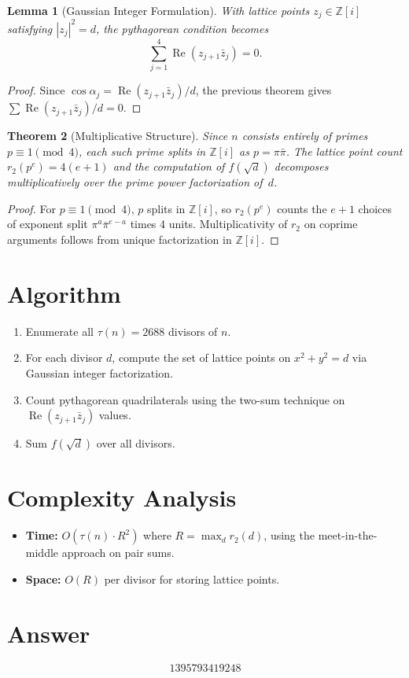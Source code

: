 \documentclass[11pt]{article}
\newtheorem{theorem}{Theorem}
\newtheorem{lemma}[theorem]{Lemma}
\begin{document}
\begin{lemma}[Gaussian Integer Formulation]
With lattice points $z_j \in \mathbb{Z}[i]$ satisfying $|z_j|^2 = d$, the pythagorean condition becomes
\[
\sum_{j=1}^{4} \operatorname{Re}(z_{j+1}\bar{z}_j) = 0.
\]
\end{lemma}

\begin{proof}
Since $\cos\alpha_j = \operatorname{Re}(z_{j+1}\bar{z}_j)/d$, the previous theorem gives $\sum\operatorname{Re}(z_{j+1}\bar{z}_j)/d = 0$.
\end{proof}

\begin{theorem}[Multiplicative Structure]
Since $n$ consists entirely of primes $p \equiv 1\pmod{4}$, each such prime splits in $\mathbb{Z}[i]$ as $p = \pi\bar\pi$. The lattice point count $r_2(p^e) = 4(e+1)$ and the computation of $f(\sqrt{d})$ decomposes multiplicatively over the prime power factorization of~$d$.
\end{theorem}

\begin{proof}
For $p\equiv 1\pmod{4}$, $p$ splits in $\mathbb{Z}[i]$, so $r_2(p^e)$ counts the $e+1$ choices of exponent split $\pi^a\bar\pi^{e-a}$ times 4 units. Multiplicativity of $r_2$ on coprime arguments follows from unique factorization in $\mathbb{Z}[i]$.
\end{proof}

\section{Algorithm}

\begin{enumerate}
\item Enumerate all $\tau(n) = 2688$ divisors of $n$.
\item For each divisor $d$, compute the set of lattice points on $x^2+y^2=d$ via Gaussian integer factorization.
\item Count pythagorean quadrilaterals using the two-sum technique on $\operatorname{Re}(z_{j+1}\bar{z}_j)$ values.
\item Sum $f(\sqrt{d})$ over all divisors.
\end{enumerate}

\section{Complexity Analysis}

\begin{itemize}
\item \textbf{Time:} $O(\tau(n) \cdot R^2)$ where $R = \max_d r_2(d)$, using the meet-in-the-middle approach on pair sums.
\item \textbf{Space:} $O(R)$ per divisor for storing lattice points.
\end{itemize}

\section{Answer}

\[
\boxed{1395793419248}
\]
\end{document}
